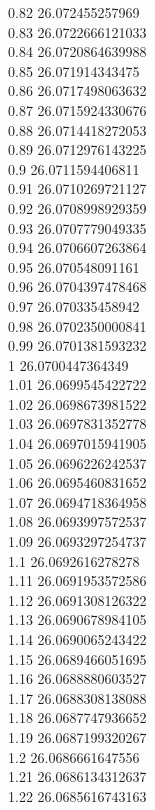 {0.82	26.072455257969\\
0.83	26.0722666121033\\
0.84	26.0720864639988\\
0.85	26.071914343475\\
0.86	26.0717498063632\\
0.87	26.0715924330676\\
0.88	26.0714418272053\\
0.89	26.0712976143225\\
0.9	26.0711594406811\\
0.91	26.0710269721127\\
0.92	26.0708998929359\\
0.93	26.0707779049335\\
0.94	26.0706607263864\\
0.95	26.070548091161\\
0.96	26.0704397478468\\
0.97	26.070335458942\\
0.98	26.0702350000841\\
0.99	26.0701381593232\\
1	26.0700447364349\\
1.01	26.0699545422722\\
1.02	26.0698673981522\\
1.03	26.0697831352778\\
1.04	26.0697015941905\\
1.05	26.0696226242537\\
1.06	26.0695460831652\\
1.07	26.0694718364958\\
1.08	26.0693997572537\\
1.09	26.0693297254737\\
1.1	26.0692616278278\\
1.11	26.0691953572586\\
1.12	26.0691308126322\\
1.13	26.0690678984105\\
1.14	26.0690065243422\\
1.15	26.0689466051695\\
1.16	26.0688880603527\\
1.17	26.0688308138088\\
1.18	26.0687747936652\\
1.19	26.0687199320267\\
1.2	26.0686661647556\\
1.21	26.0686134312637\\
1.22	26.0685616743163\\
}
